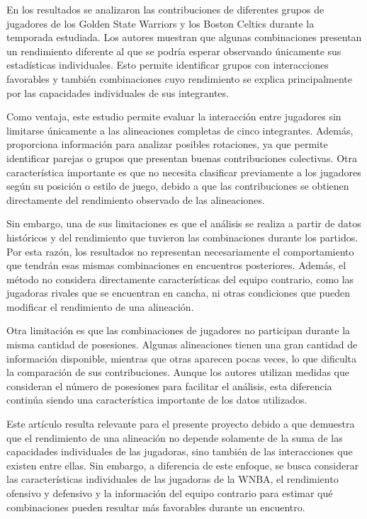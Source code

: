 En los resultados se analizaron las contribuciones de diferentes grupos de jugadores de los Golden State Warriors y los Boston Celtics durante la temporada estudiada. Los autores muestran que algunas combinaciones presentan un rendimiento diferente al que se podría esperar observando únicamente sus estadísticas individuales. Esto permite identificar grupos con interacciones favorables y también combinaciones cuyo rendimiento se explica principalmente por las capacidades individuales de sus integrantes.

Como ventaja, este estudio permite evaluar la interacción entre jugadores sin limitarse únicamente a las alineaciones completas de cinco integrantes. Además, proporciona información para analizar posibles rotaciones, ya que permite identificar parejas o grupos que presentan buenas contribuciones colectivas. Otra característica importante es que no necesita clasificar previamente a los jugadores según su posición o estilo de juego, debido a que las contribuciones se obtienen directamente del rendimiento observado de las alineaciones.

Sin embargo, una de sus limitaciones es que el análisis se realiza a partir de datos históricos y del rendimiento que tuvieron las combinaciones durante los partidos. Por esta razón, los resultados no representan necesariamente el comportamiento que tendrán esas mismas combinaciones en encuentros posteriores. Además, el método no considera directamente características del equipo contrario, como las jugadoras rivales que se encuentran en cancha, ni otras condiciones que pueden modificar el rendimiento de una alineación.

Otra limitación es que las combinaciones de jugadores no participan durante la misma cantidad de posesiones. Algunas alineaciones tienen una gran cantidad de información disponible, mientras que otras aparecen pocas veces, lo que dificulta la comparación de sus contribuciones. Aunque los autores utilizan medidas que consideran el número de posesiones para facilitar el análisis, esta diferencia continúa siendo una característica importante de los datos utilizados.

Este artículo resulta relevante para el presente proyecto debido a que demuestra que el rendimiento de una alineación no depende solamente de la suma de las capacidades individuales de las jugadoras, sino también de las interacciones que existen entre ellas. Sin embargo, a diferencia de este enfoque, se busca considerar las características individuales de las jugadoras de la WNBA, el rendimiento ofensivo y defensivo y la información del equipo contrario para estimar qué combinaciones pueden resultar más favorables durante un encuentro.

